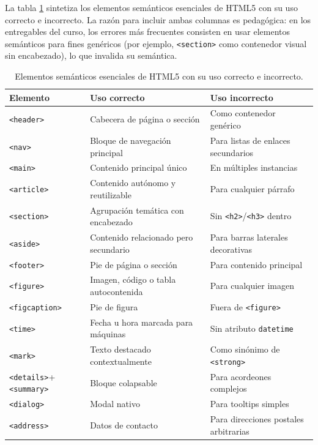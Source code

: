 La tabla \ref{tab:semanticos} sintetiza los elementos semánticos
esenciales de HTML5 con su uso correcto e incorrecto. La razón
para incluir ambas columnas es pedagógica: en los entregables del
curso, los errores más frecuentes consisten en usar elementos
semánticos para fines genéricos (por ejemplo, \texttt{<section>}
como contenedor visual sin encabezado), lo que invalida su
semántica.

\begin{table}[htbp]
\centering
\caption{Elementos semánticos esenciales de HTML5 con su uso correcto e incorrecto.}
\label{tab:semanticos}
\footnotesize
\begin{tabularx}{\textwidth}{lXX}
\toprule
\textbf{Elemento} & \textbf{Uso correcto} & \textbf{Uso incorrecto}\\
\midrule
\texttt{<header>}  & Cabecera de página o sección & Como contenedor genérico\\
\texttt{<nav>}     & Bloque de navegación principal & Para listas de enlaces secundarios\\
\texttt{<main>}    & Contenido principal único & En múltiples instancias\\
\texttt{<article>} & Contenido autónomo y reutilizable & Para cualquier párrafo\\
\texttt{<section>} & Agrupación temática con encabezado & Sin \texttt{<h2>}/\texttt{<h3>} dentro\\
\texttt{<aside>}   & Contenido relacionado pero secundario & Para barras laterales decorativas\\
\texttt{<footer>}  & Pie de página o sección & Para contenido principal\\
\texttt{<figure>}  & Imagen, código o tabla autocontenida & Para cualquier imagen\\
\texttt{<figcaption>} & Pie de figura & Fuera de \texttt{<figure>}\\
\texttt{<time>}    & Fecha u hora marcada para máquinas & Sin atributo \texttt{datetime}\\
\texttt{<mark>}    & Texto destacado contextualmente & Como sinónimo de \texttt{<strong>}\\
\texttt{<details>}+\texttt{<summary>} & Bloque colapsable & Para acordeones complejos\\
\texttt{<dialog>}  & Modal nativo & Para tooltips simples\\
\texttt{<address>} & Datos de contacto & Para direcciones postales arbitrarias\\
\bottomrule
\end{tabularx}
\end{table}

